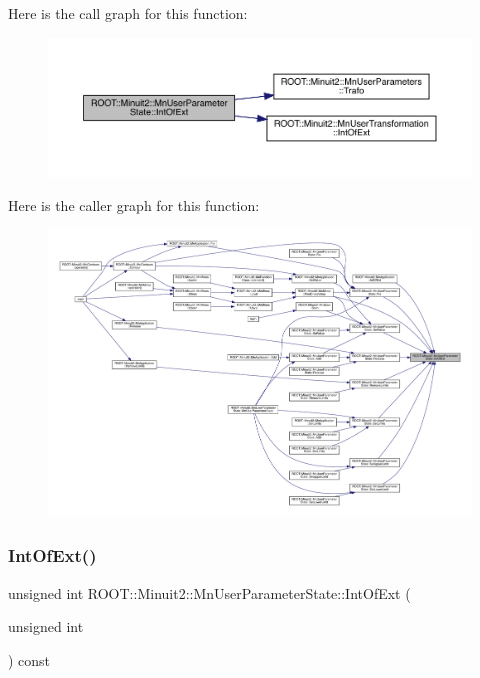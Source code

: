 Here is the call graph for this function\+:\nopagebreak
\begin{figure}[H]
\begin{center}
\leavevmode
\includegraphics[width=350pt]{d3/de0/classROOT_1_1Minuit2_1_1MnUserParameterState_ab07f3ff917c70471b327243764aaad83_cgraph}
\end{center}
\end{figure}
Here is the caller graph for this function\+:\nopagebreak
\begin{figure}[H]
\begin{center}
\leavevmode
\includegraphics[width=350pt]{d3/de0/classROOT_1_1Minuit2_1_1MnUserParameterState_ab07f3ff917c70471b327243764aaad83_icgraph}
\end{center}
\end{figure}
\mbox{\label{classROOT_1_1Minuit2_1_1MnUserParameterState_ab07f3ff917c70471b327243764aaad83}} 
\subsubsection{\texorpdfstring{IntOfExt()}{IntOfExt()}\hspace{0.1cm}{\footnotesize\ttfamily [2/2]}}
{\footnotesize\ttfamily unsigned int R\+O\+O\+T\+::\+Minuit2\+::\+Mn\+User\+Parameter\+State\+::\+Int\+Of\+Ext (\begin{DoxyParamCaption}\item[{unsigned int}]{ }\end{DoxyParamCaption}) const}

